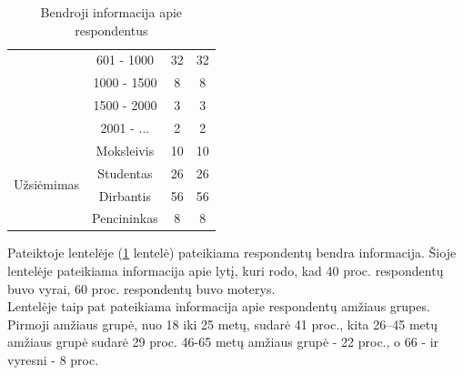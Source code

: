 \documentclass[12pt,titlepage]{article}
\begin{document}
\begin{table}[H]
\begin{tabular}{|c|c|c|c|}
                                                                                    & 601 - 1000  & 32              & 32                                                                \\ \cline{2-4} 
                                                                                    & 1000 - 1500 & 8               & 8                                                                 \\ \cline{2-4} 
                                                                                    & 1500 - 2000 & 3               & 3                                                                 \\ \cline{2-4} 
                                                                                    & 2001 - ...  & 2               & 2                                                                 \\ \hline
\multirow{4}{*}{Užsiėmimas}                                                         & Moksleivis  & 10              & 10                                                                \\ \cline{2-4} 
                                                                                    & Studentas   & 26              & 26                                                                \\ \cline{2-4} 
                                                                                    & Dirbantis   & 56              & 56                                                                \\ \cline{2-4} 
                                                                                    & Pencininkas & 8               & 8                                                                 \\ \hline
\end{tabular}
\caption{Bendroji informacija apie respondentus}
\label{tab:table2}
\end{table}

\hspace{\parindent}
Pateiktoje lentelėje (\ref{tab:table2} lentelė) pateikiama respondentų bendra informacija. Šioje lentelėje pateikiama informacija apie lytį, kuri rodo, kad 40 proc.  respondentų buvo vyrai, 60 proc. respondentų buvo moterys.\\

Lentelėje taip pat  pateikiama informacija apie respondentų amžiaus grupes. Pirmoji amžiaus grupė, nuo 18 iki 25 metų, sudarė 41 proc., kita 26–45 metų amžiaus grupė sudarė 29 proc. 46-65 metų amžiaus grupė - 22 proc., o 66 - ir vyresni - 8 proc.\\
\end{document}
